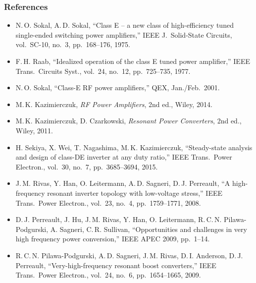 \begin{frame}
	\frametitle{References}
	\scriptsize
	\begin{itemize}
		\item N.\,O. Sokal, A.\,D. Sokal, ``Class E -- a new class of high-efficiency tuned single-ended switching power amplifiers,'' IEEE J.\ Solid-State Circuits, vol.\ SC-10, no.\ 3, pp.\ 168--176, 1975.
		\item F.\,H. Raab, ``Idealized operation of the class E tuned power amplifier,'' IEEE Trans.\ Circuits Syst., vol.\ 24, no.\ 12, pp.\ 725--735, 1977.
		\item N.\,O. Sokal, ``Class-E RF power amplifiers,'' QEX, Jan./Feb.\ 2001.
		\item M.\,K. Kazimierczuk, \textit{RF Power Amplifiers}, 2nd ed., Wiley, 2014.
		\item M.\,K. Kazimierczuk, D. Czarkowski, \textit{Resonant Power Converters}, 2nd ed., Wiley, 2011.
		\item H. Sekiya, X. Wei, T. Nagashima, M.\,K. Kazimierczuk, ``Steady-state analysis and design of class-DE inverter at any duty ratio,'' IEEE Trans.\ Power Electron., vol.\ 30, no.\ 7, pp.\ 3685--3694, 2015.
		\item J.\,M. Rivas, Y. Han, O. Leitermann, A.\,D. Sagneri, D.\,J. Perreault, ``A high-frequency resonant inverter topology with low-voltage stress,'' IEEE Trans.\ Power Electron., vol.\ 23, no.\ 4, pp.\ 1759--1771, 2008.
		\item D.\,J. Perreault, J. Hu, J.\,M. Rivas, Y. Han, O. Leitermann, R.\,C.\,N. Pilawa-Podgurski, A. Sagneri, C.\,R. Sullivan, ``Opportunities and challenges in very high frequency power conversion,'' IEEE APEC 2009, pp.\ 1--14.
		\item R.\,C.\,N. Pilawa-Podgurski, A.\,D. Sagneri, J.\,M. Rivas, D.\,I. Anderson, D.\,J. Perreault, ``Very-high-frequency resonant boost converters,'' IEEE Trans.\ Power Electron., vol.\ 24, no.\ 6, pp.\ 1654--1665, 2009.
	\end{itemize}
\end{frame}


